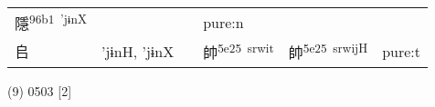 \documentclass[14pt,a4paper]{scrartcl}
\begin{document}
\begin{longtable}[c]{@{}llllll@{}}
\begin{minipage}[t]{0.14\columnwidth}
隱\textsuperscript{96b1~'jɨnX}
\strut\end{minipage} &
\begin{minipage}[t]{0.14\columnwidth}\raggedright\strut
\strut\end{minipage} &
\begin{minipage}[t]{0.14\columnwidth}\raggedright\strut
\strut\end{minipage} &
\begin{minipage}[t]{0.14\columnwidth}\raggedright\strut
pure:n
\strut\end{minipage}\tabularnewline
\begin{minipage}[t]{0.14\columnwidth}\raggedright\strut
𠂤
\strut\end{minipage} &
\begin{minipage}[t]{0.14\columnwidth}\raggedright\strut
'jɨnH, 'jɨnX
\strut\end{minipage} &
\begin{minipage}[t]{0.14\columnwidth}\raggedright\strut
\strut\end{minipage} &
\begin{minipage}[t]{0.14\columnwidth}\raggedright\strut
帥\textsuperscript{5e25~srwit}
\strut\end{minipage} &
\begin{minipage}[t]{0.14\columnwidth}\raggedright\strut
帥\textsuperscript{5e25~srwijH}
\strut\end{minipage} &
\begin{minipage}[t]{0.14\columnwidth}\raggedright\strut
pure:t
\strut\end{minipage}\tabularnewline
\bottomrule
\end{longtable}

(9) 0503 {[}2{]}
\end{document}
